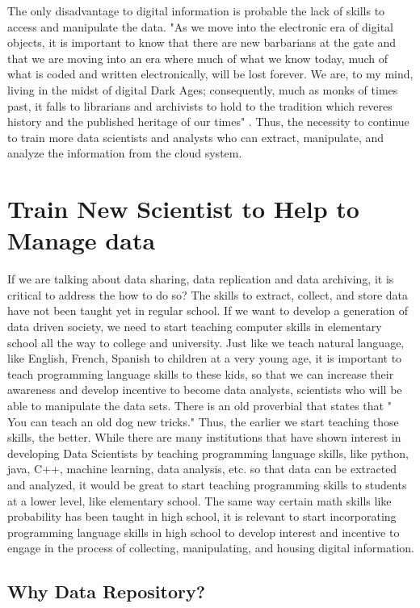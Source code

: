 \documentclass[sigconf]{acmart}
\begin{document}
The only disadvantage to digital information is probable the lack of skills to access and manipulate the data. "As we move into the electronic era of digital objects, it is important to know that there are new barbarians at the gate and that we are moving into an era where much of what we know today, much of what is coded and written electronically, will be lost forever. We are, to my mind, living in the midst of digital Dark Ages; consequently, much as monks of times past, it falls to librarians and archivists to hold to the tradition which reveres history and the published heritage of our times" \cite{stamatiadis2005digital}. Thus, the necessity to continue to train more data scientists and analysts who can extract, manipulate, and analyze the information from the cloud system.  

\section{Train New Scientist to Help to Manage data}

If we are talking about data sharing, data replication and data archiving, it is critical to address the how to do so? The skills to extract, collect, and store data have not been taught yet in regular school. If we want to develop a generation of data driven society, we need to start teaching computer skills in elementary school all the way to college and university. Just like we teach natural language, like English, French, Spanish to children at a very young age, it is important to teach programming language skills to these kids, so that we can increase their awareness and develop incentive to become data analysts, scientists who will be able to manipulate the data sets. There is an old proverbial that states that " You can teach an old dog new tricks." Thus, the earlier we start teaching those skills, the better.  While there are many institutions that have shown interest in developing Data Scientists by teaching programming language skills, like python, java, C++, machine learning, data analysis, etc. so that data can be extracted and analyzed, it would be great to start teaching programming skills to students at a lower level, like elementary school. The same way certain math skills like probability has been taught in high school, it is relevant to start incorporating programming language skills in high school to develop interest and incentive to engage in the process of collecting, manipulating, and housing digital information.

 
\subsection{Why Data Repository?}
\end{document}
